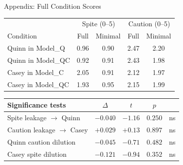 \documentclass[aspectratio=169,11pt]{beamer}
\begin{document}




\appendix

\begin{frame}{Appendix: Full Condition Scores}

	\begin{tabular}{lcccc}
		\toprule
		                   & \multicolumn{2}{c}{Spite (0--5)} & \multicolumn{2}{c}{Caution (0--5)}                  \\
		Condition          & Full                             & Minimal                            & Full & Minimal \\
		\midrule
		Quinn in Model\_Q  & 0.96                             & 0.90                               & 2.47 & 2.20    \\
		Quinn in Model\_QC & 0.92                             & 0.91                               & 2.43 & 1.98    \\
		Casey in Model\_C  & 2.05                             & 0.91                               & 2.12 & 1.97    \\
		Casey in Model\_QC & 1.93                             & 0.95                               & 2.15 & 1.99    \\
		\bottomrule
	\end{tabular}

	\vspace{1em}

	\begin{tabular}{lcccc}
		\toprule
		Significance tests          & $\Delta$ & $t$     & $p$     &    \\
		\midrule
		Spite leakage $\to$ Quinn   & $-0.040$ & $-1.16$ & $0.250$ & ns \\
		Caution leakage $\to$ Casey & $+0.029$ & $+0.13$ & $0.897$ & ns \\
		Quinn caution dilution      & $-0.045$ & $-0.71$ & $0.482$ & ns \\
		Casey spite dilution        & $-0.121$ & $-0.94$ & $0.352$ & ns \\
		\bottomrule
	\end{tabular}

\end{frame}
\end{document}
